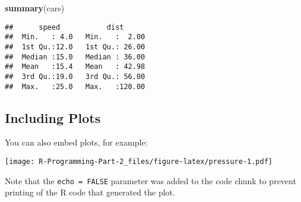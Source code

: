 \documentclass[
]{article}
\newenvironment{Shaded}{\begin{snugshade}}{\end{snugshade}}
\newcommand{\FunctionTok}[1]{\textcolor[rgb]{0.13,0.29,0.53}{\textbf{#1}}}
\newcommand{\NormalTok}[1]{#1}
\begin{document}
\begin{Shaded}
\begin{Highlighting}[]
\FunctionTok{summary}\NormalTok{(cars)}
\end{Highlighting}
\end{Shaded}

\begin{verbatim}
##      speed           dist       
##  Min.   : 4.0   Min.   :  2.00  
##  1st Qu.:12.0   1st Qu.: 26.00  
##  Median :15.0   Median : 36.00  
##  Mean   :15.4   Mean   : 42.98  
##  3rd Qu.:19.0   3rd Qu.: 56.00  
##  Max.   :25.0   Max.   :120.00
\end{verbatim}

\hypertarget{including-plots}{%
\subsection{Including Plots}\label{including-plots}}

You can also embed plots, for example:

\texttt{[image: R-Programming-Part-2\_files/figure-latex/pressure-1.pdf]}

Note that the \texttt{echo\ =\ FALSE} parameter was added to the code
chunk to prevent printing of the R code that generated the plot.
\end{document}
